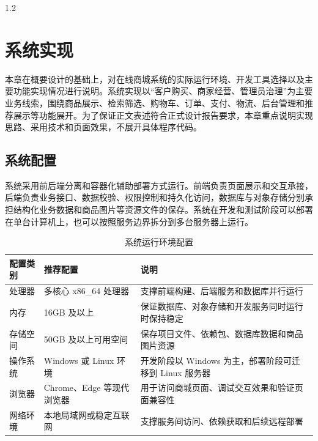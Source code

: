 ﻿\documentclass[oneside, UTF8]{ctexbook}
\begin{document}
\frontmatter
\pagestyle{plain}

\begin{spacing}{1.2}
  \tableofcontents
\end{spacing}
\newpage

\mainmatter

\setcounter{chapter}{1}
\chapter{系统实现}

本章在概要设计的基础上，对在线商城系统的实际运行环境、开发工具选择以及主要功能实现情况进行说明。系统实现以“客户购买、商家经营、管理员治理”为主要业务线索，围绕商品展示、检索筛选、购物车、订单、支付、物流、后台管理和推荐展示等功能展开。为了保证正文表述符合正式设计报告要求，本章重点说明实现思路、采用技术和页面效果，不展开具体程序代码。

\section{系统配置}

系统采用前后端分离和容器化辅助部署方式运行。前端负责页面展示和交互承接，后端负责业务接口、数据校验、权限控制和持久化访问，数据库与对象存储分别承担结构化业务数据和商品图片等资源文件的保存。系统在开发和测试阶段可以部署在单台计算机上，也可以按照服务边界拆分到多台服务器上运行。

\begin{table}[H]
  \centering
  \caption{系统运行环境配置}
  \label{tab:implementation_system_config}
  \small
  \renewcommand{\arraystretch}{1.22}
  \begin{tabular}{p{}p{}p{}}
    \toprule
    配置类别 & 推荐配置 & 说明 \\
    \midrule
    处理器 & 多核心 x86\_64 处理器 & 支撑前端构建、后端服务和数据库并行运行 \\
    内存 & 16GB 及以上 & 保证数据库、对象存储和开发服务同时运行时保持稳定 \\
    存储空间 & 50GB 及以上可用空间 & 保存项目文件、依赖包、数据库数据和商品图片资源 \\
    操作系统 & Windows 或 Linux 环境 & 开发阶段以 Windows 为主，部署阶段可迁移到 Linux 服务器 \\
    浏览器 & Chrome、Edge 等现代浏览器 & 用于访问商城页面、调试交互效果和验证页面兼容性 \\
    网络环境 & 本地局域网或稳定互联网 & 支撑服务间访问、依赖获取和后续远程部署 \\
    \bottomrule
  \end{tabular}
\end{table}
\end{document}
